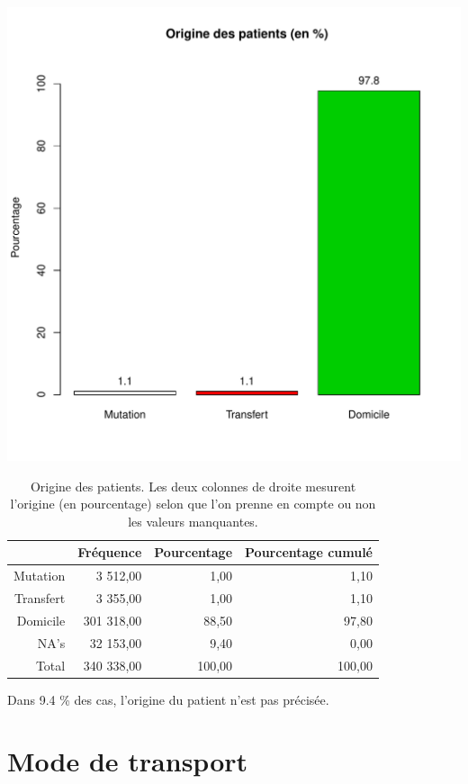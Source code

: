 \documentclass[12pt,english,french,twoside]{book}\usepackage[]{graphicx}\usepackage[]{color}
\makeatletter
\def\maxwidth{ %
  \ifdim\Gin@nat@width>\linewidth
    \linewidth
  \else
    \Gin@nat@width
  \fi
}
\makeatother
\begin{document}
\includegraphics[width=\maxwidth]{figure/mode_entree} 
\begin{table}[ht]
\centering
\begin{tabular}{rrrr}
  \hline
 & Fréquence & Pourcentage & Pourcentage cumulé \\ 
  \hline
Mutation & 3 512,00 & 1,00 & 1,10 \\ 
  Transfert & 3 355,00 & 1,00 & 1,10 \\ 
  Domicile & 301 318,00 & 88,50 & 97,80 \\ 
  NA's & 32 153,00 & 9,40 & 0,00 \\ 
    Total & 340 338,00 & 100,00 & 100,00 \\ 
   \hline
\end{tabular}
\caption[Origine des patients]{Origine des patients. Les deux colonnes de droite mesurent l'origine (en pourcentage) selon que l'on prenne en compte ou non les valeurs manquantes. } 
\label{origine}
\end{table}



Dans 9.4 \% des cas, l'origine du patient n'est pas précisée.

\section*{Mode de transport}
\end{document}
